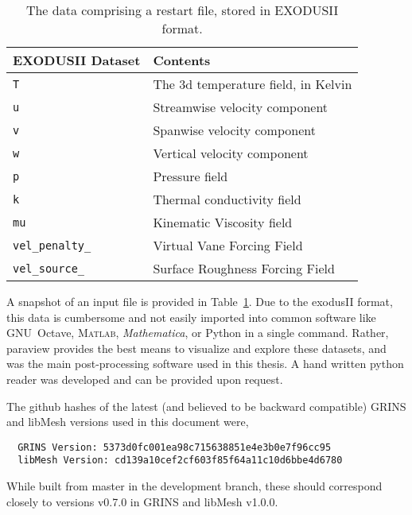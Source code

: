 \begin{table}
\centering
\caption[Instantaneous fields and other details comprising a restart file]{%
  The data comprising a restart file, stored in EXODUSII
 format.\label{tbl:EXO}
}
\begin{small}
\begin{tabular}{p{}|p{}}
EXODUSII Dataset & Contents \\ \hline \hline
\texttt{T                     } & The 3d temperature field, in Kelvin \\
\texttt{u                     } & Streamwise velocity component \\ 
\texttt{v                     } & Spanwise velocity component \\ 
\texttt{w                     } & Vertical velocity component \\ 
\texttt{p                     } & Pressure field \\ 
\texttt{k                     } & Thermal conductivity field \\ 
\texttt{mu                    } & Kinematic Viscosity field \\ 
\texttt{vel\_penalty\_        } & Virtual Vane Forcing Field \\ 
\texttt{vel\_source\_        }  & Surface Roughness Forcing Field 
\end{tabular}
\end{small}
\end{table}

A snapshot of an input file is provided in Table~\ref{tbl:EXO}. 
Due to the exodusII format, this data is cumbersome and not easily
imported into common software like GNU~Octave,
\textsc{Matlab}\textsuperscript{\textregistered},
\textit{Mathematica}\textsuperscript{\textregistered}, or Python in a
single command. Rather, paraview provides the best means to visualize 
and explore these datasets, and was the main post-processing software
used in this thesis. A hand written python reader was developed and can
be provided upon request. 

The github hashes of the latest (and believed to be backward compatible)
GRINS and libMesh versions used in this document were, 
\begin{verbatim}
  GRINS Version: 5373d0fc001ea98c715638851e4e3b0e7f96cc95                                                  
  libMesh Version: cd139a10cef2cf603f85f64a11c10d6bbe4d6780
\end{verbatim}
%
While built from master in the development branch, these should
correspond closely to versions v0.7.0 in GRINS and libMesh v1.0.0.  

